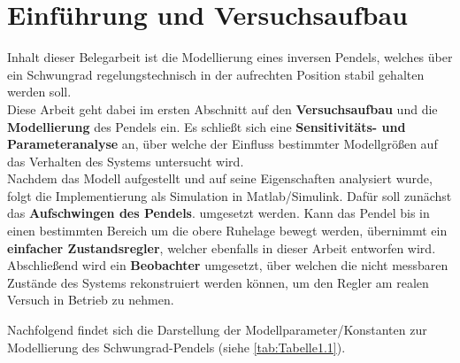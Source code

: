 \pagestyle{aaron}
\section{Einführung und Versuchsaufbau} \label{sec:Einfuehrung}

Inhalt dieser Belegarbeit ist die Modellierung eines inversen Pendels, welches über ein Schwungrad regelungstechnisch in der aufrechten Position stabil gehalten werden soll. \\

Diese Arbeit geht dabei im ersten Abschnitt auf den \textbf{Versuchsaufbau} und die \textbf{Modellierung} des Pendels ein. Es schließt sich eine \textbf{Sensitivitäts- und Parameteranalyse} an, über welche der Einfluss bestimmter Modellgrößen auf das Verhalten des Systems untersucht wird. \\
Nachdem das Modell aufgestellt und auf seine Eigenschaften analysiert wurde, folgt die Implementierung als Simulation in Matlab/Simulink. Dafür soll zunächst das \textbf{Aufschwingen des Pendels}. umgesetzt werden. Kann das Pendel bis in einen bestimmten Bereich um die obere Ruhelage bewegt werden, übernimmt ein \textbf{einfacher Zustandsregler}, welcher ebenfalls in dieser Arbeit entworfen wird. \\
Abschließend wird ein \textbf{Beobachter} umgesetzt, über welchen die nicht messbaren Zustände des Systems rekonstruiert werden können, um den Regler am realen Versuch in Betrieb zu nehmen.

Nachfolgend findet sich die Darstellung der Modellparameter/Konstanten zur Modellierung des Schwungrad-Pendels (siehe \autoref{tab:Tabelle1.1}).

